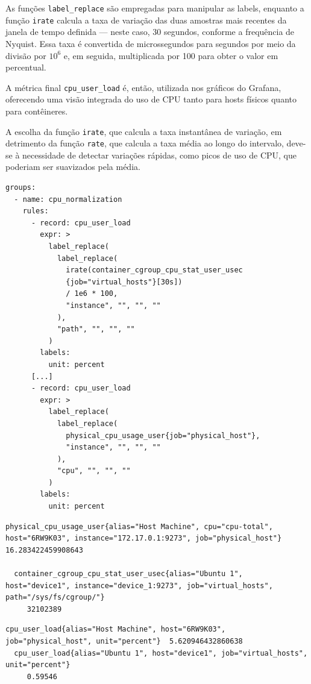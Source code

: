 As funções \verb|label_replace| são empregadas para manipular as labels, enquanto a função \verb|irate| calcula a taxa de variação das duas amostras mais recentes da janela de tempo definida --- neste caso, 30 segundos, conforme a frequência de Nyquist. Essa taxa é convertida de microssegundos para segundos por meio da divisão por $10^{6}$ e, em seguida, multiplicada por 100 para obter o valor em percentual.

A métrica final \verb|cpu_user_load| é, então, utilizada nos gráficos do Grafana, oferecendo uma visão integrada do uso de CPU tanto para hosts físicos quanto para contêineres.

A escolha da função \verb|irate|, que calcula a taxa instantânea de variação, em detrimento da função \verb|rate|, que calcula a taxa média ao longo do intervalo, deve-se à necessidade de detectar variações rápidas, como picos de uso de CPU, que poderiam ser suavizados pela média.

\begin{lstlisting}[caption={Arquivo cpu.yml}, label={lst:cpu_user_load}]
groups:
  - name: cpu_normalization
    rules:
      - record: cpu_user_load
        expr: >
          label_replace(
            label_replace(
              irate(container_cgroup_cpu_stat_user_usec
              {job="virtual_hosts"}[30s]) 
              / 1e6 * 100,
              "instance", "", "", ""
            ),
            "path", "", "", ""
          )
        labels:
          unit: percent
      [...]
      - record: cpu_user_load
        expr: >
          label_replace(
            label_replace(
              physical_cpu_usage_user{job="physical_host"},
              "instance", "", "", ""
            ),
            "cpu", "", "", ""
          )
        labels:
          unit: percent
\end{lstlisting}

\newpage

\begin{lstlisting}[caption={Métricas de CPU \myenquote{Carga de usuário} pré-normalização}, label={lst:telegraf-cpu-user-load}]
  physical_cpu_usage_user{alias="Host Machine", cpu="cpu-total", host="6RW9K03", instance="172.17.0.1:9273", job="physical_host"}	16.283422459908643

  container_cgroup_cpu_stat_user_usec{alias="Ubuntu 1", host="device1", instance="device_1:9273", job="virtual_hosts", path="/sys/fs/cgroup/"}
     32102389
\end{lstlisting}

\begin{lstlisting}[caption={Métricas de CPU \myenquote{Carga de usuário} normalizadas}, label={lst:normalized-cpu-user-load}]
  cpu_user_load{alias="Host Machine", host="6RW9K03", job="physical_host", unit="percent"}	5.620946432860638 
  cpu_user_load{alias="Ubuntu 1", host="device1", job="virtual_hosts", unit="percent"}	
     0.59546
\end{lstlisting}

